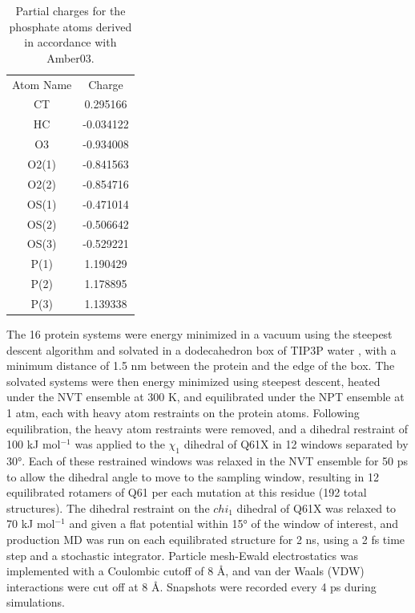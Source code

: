 \begin{table}
    \caption[Partial charges for phosphate atoms]{
        Partial charges for the phosphate atoms derived in accordance with Amber03.
    }
    \begin{center}
    \begin{tabular}{cc}
    \toprule
       \rowcolor{lgray}
       Atom Name & Charge  \\
        \cmidrule(r){1-1}\cmidrule(l){2-2}
     CT  &        0.295166 \\
      HC &        -0.034122 \\
     O3  &       -0.934008   \\
     O2(1)  &   -0.841563   \\
     O2(2) &    -0.854716   \\
     OS(1)  &   -0.471014   \\
     OS(2)  &   -0.506642   \\
     OS(3) &    -0.529221   \\
     P(1)   &     1.190429   \\
     P(2)   &     1.178895   \\
     P(3)   &     1.139338   \\
    \bottomrule
    \end{tabular}
    \end{center}
    \label{tbl:ras-charges}
\end{table}

The 16 protein systems were energy minimized in a vacuum using the steepest descent algorithm and solvated in a dodecahedron box of TIP3P water \cite{Jorgensen1983}, with a minimum distance of 1.5 nm between the protein and the edge of the box. 
The solvated systems were then energy minimized using steepest descent, heated under the NVT ensemble at 300 K, and equilibrated under the NPT ensemble at 1 atm, each with heavy atom restraints on the protein atoms. 
Following equilibration, the heavy atom restraints were removed, and a dihedral restraint of 100 kJ mol$^{-1}$ was applied to the $\chi_1$ dihedral of Q61X in 12 windows separated by \ang{30}. 
Each of these restrained windows was relaxed in the NVT ensemble for 50 ps to allow the dihedral angle to move to the sampling window, resulting in 12 equilibrated rotamers of Q61 per each mutation at this residue (192 total structures). 
The dihedral restraint on the $chi_1$ dihedral of Q61X was relaxed to 70 kJ mol$^{-1}$ and given a flat potential within \ang{15} of the window of interest, and production MD was run on each equilibrated structure for 2 ns, using a 2 fs time step and a stochastic integrator. 
Particle mesh-Ewald electrostatics\cite{Cheatham1995} was implemented with a Coulombic cutoff of 8 \si{\angstrom}, and van der Waals (VDW) interactions were cut off at 8 \si{\angstrom}. 
Snapshots were recorded every 4 ps during simulations.

